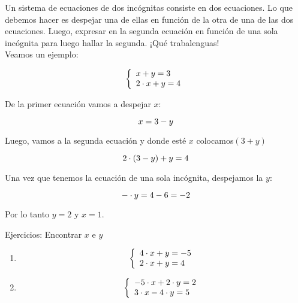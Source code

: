 Un sistema de ecuaciones de dos incógnitas consiste en dos ecuaciones. Lo que debemos hacer es despejar una de ellas en función de la otra de una de las dos ecuaciones. Luego, expresar en la segunda ecuación en función de una sola incógnita para luego hallar la segunda. ¡Qué trabalenguas! \\

Veamos un ejemplo:

\begin{equation}
    \notag
     \left\{ \begin{array}{lcc}
             x + y =3 
             \\2\cdot x + y = 4
             \end{array}
   \right.
\end{equation}

De la primer ecuación vamos a despejar $x$:

\begin{equation}
    \notag
    x = 3 - y
\end{equation}

Luego, vamos a la segunda ecuación y donde esté $x$ colocamos$(3+y)$

\begin{equation}
    \notag
    2\cdot  ( 3 - y ) +y =4
\end{equation}

Una vez que tenemos la ecuación de una sola incógnita, despejamos la $y$:

\begin{equation}
    \notag
    -\cdot y = 4- 6 =-2
\end{equation}

Por lo tanto $y=2$ y $x=1$.\\
\medskip

Ejercicios: Encontrar $x$ e $y$
\begin{enumerate}
\renewcommand{\labelenumi}{{\theenumi})}
\item 
    \begin{equation}
    \notag
     \left\{ \begin{array}{lcc}
             4\cdot x +y =-5 
             \\2\cdot x + y = 4
             \end{array}
   \right.
   \end{equation}
\item 
    \begin{equation}
    \notag
     \left\{ \begin{array}{lcc}
             -5\cdot x +2\cdot y =2
             \\3\cdot x-4\cdot  y = 5
             \end{array}
   \right.
     \end{equation}


\end{enumerate}

